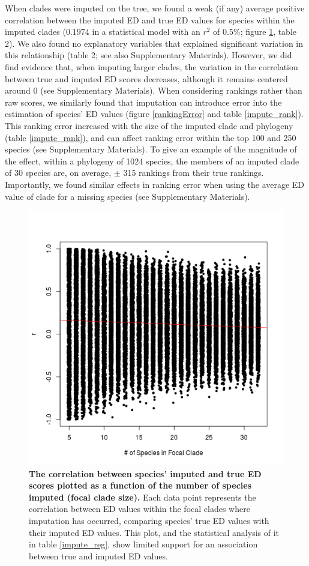 \documentclass[10pt,english]{article}
\begin{document}
When clades were imputed on the tree, we found a weak (if any) average positive
correlation between the imputed ED and true ED values for species within the
imputed clades ($0.1974$ in a statistical model with an $r^2$ of $0.5\%$; figure
\ref{imputationTrend}, table 2). We also found no explanatory variables that
explained significant variation in this relationship (table 2; see also
Supplementary Materials). However, we did find evidence that, when imputing
larger clades, the variation in the correlation between true and imputed ED
scores decreases, although it remains centered around 0 (see Supplementary
Materials). When considering rankings rather than raw scores, we similarly found
that imputation can introduce error into the estimation of species' ED values
(figure \ref{rankingError} and table \ref{impute_rank}). This ranking error
increased with the size of the imputed clade and phylogeny (table
\ref{impute_rank}), and can affect ranking error within the top 100 and 250
species (see Supplementary Materials). To give an example of the magnitude of
the effect, within a phylogeny of 1024 species, the members of an imputed clade
of 30 species are, on average, $\pm$ 315 rankings from their true rankings.
Importantly, we found similar effects in ranking error when using the average ED
value of clade for a missing species (see Supplementary Materials).

\begin{figure}[!ht]
  \center
  \includegraphics[width=.5\textwidth]{edModel.png}
  \caption{\textbf{The correlation between species' imputed and true
      ED scores plotted as a function of the number of species imputed
      (focal clade size).} Each data point represents the correlation
    between ED values within the focal clades where imputation has
    occurred, comparing species' true ED values with their imputed ED
    values. This plot, and the statistical analysis of it in table
    \ref{impute_reg}, show limited support for an association between
    true and imputed ED values.}
  \label{imputationTrend}
\end{figure}
\end{document}
